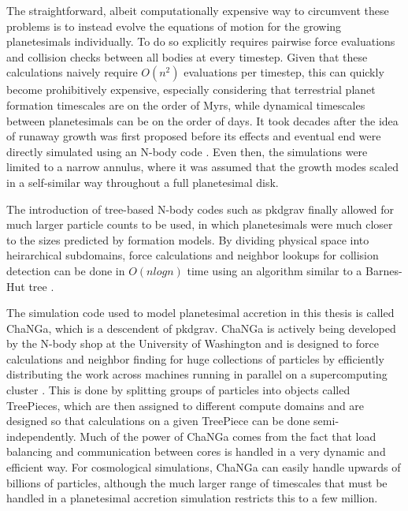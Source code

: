 The straightforward, albeit computationally expensive way to circumvent these problems is to instead evolve the equations of motion for the growing planetesimals individually. To do so explicitly requires pairwise force evaluations and collision checks between all bodies at every timestep. Given that these calculations naively require $O(n^2)$ evaluations per timestep, this can quickly become prohibitively expensive, especially considering that terrestrial planet formation timescales are on the order of Myrs, while dynamical timescales between planetesimals can be on the order of days. It took decades after the idea of runaway growth was first proposed before its effects and eventual end were directly simulated using an N-body code \cite{kokubo96, kokubo98}. Even then, the simulations were limited to a narrow annulus, where it was assumed that the growth modes scaled in a self-similar way throughout a full planetesimal disk.

The introduction of tree-based N-body codes such as {\sc pkdgrav} \cite{richardson00, stadel01, wadsley04} finally allowed for much larger particle counts to be used, in which planetesimals were much closer to the sizes predicted by formation models. By dividing physical space into heirarchical subdomains, force calculations and neighbor lookups for collision detection can be done in $O (n log n)$ time using an algorithm similar to a Barnes-Hut tree \cite{barnes86}. 

The simulation code used to model planetesimal accretion in this thesis is called {\sc ChaNGa}, which is a descendent of {\sc pkdgrav}. {\sc ChaNGa} is actively being developed by the N-body shop at the University of Washington and is designed to force calculations and neighbor finding for huge collections of particles by efficiently distributing the work across machines running in parallel on a supercomputing cluster \cite{jetley08, menon15}. This is done by splitting groups of particles into objects called TreePieces, which are then assigned to different compute domains and are designed so that calculations on a given TreePiece can be done semi-independently. Much of the power of {\sc ChaNGa} comes from the fact that load balancing and communication between cores is handled in a very dynamic and efficient way. For cosmological simulations, {\sc ChaNGa} can easily handle upwards of billions of particles, although the much larger range of timescales that must be handled in a planetesimal accretion simulation restricts this to a few million.

